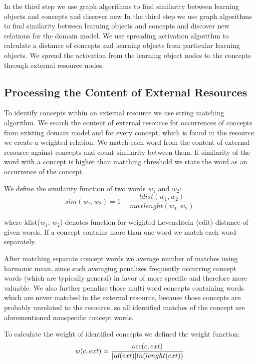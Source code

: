 \documentclass[a4, conference]{IEEEtran}
\begin{document}
In the third step we use graph algorithms to find similarity between learning objects and concepts and discover new In the third step we use graph algorithms to find similarity between learning objects and concepts and discover new relations for the domain model. We use spreading activation algorithm to calculate a distance of concepts and learning objects from particular learning objects. We spread the activation from the learning object nodes to the concepts through external resource nodes. 
\subsection{Processing the Content of External Resources }%
% 
To identify concepts within an external resource we use string matching algorithm. We search the content of external resource for occurrences of concepts from existing domain model and for every concept, which is found in the resource we create a weighted relation. We match each word from the content of external resource against concepts and count similarity between them. If similarity of the word with a concept is higher than matching threshold we state the word as an occurrence of the concept.

We define the similarity function of two words $w_{1}$ and $w_{2}$:
\begin{equation}%
sim(w_{1},w_{2})= 1-\frac{ldist(w_{1},w_{2})}{max lenght(w_{1},w_{2})}
\end{equation}

where ldist($w_{1}$, $w_{2}$) denotes function for weighted Levenshtein (edit) distance of given words. If a concept contains more than one word we match each word separately.

After matching separate concept words we average number of matches using harmonic mean, since such averaging penalizes frequently occurring concept words (which are typically general) in favor of more specific and therefore more valuable. We also further penalize those multi word concepts containing words which are never matched in the external resource, because those concepts are probably unrelated to the resource, so all identified matches of the concept are aforementioned nonspecific concept words.

To calculate the weight of identified concepts we defined the weight function: 
\begin{equation}
w(c,ext) = \frac{occ(c,ext)}{\arrowvert id(ext)\arrowvert ln(lenght(ext))}
\end{equation}
\end{document}
